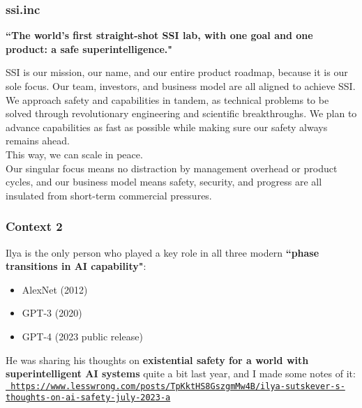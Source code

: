 \documentclass{beamer}
\newenvironment{customquote}
  {\begin{adjustwidth}{2em}{2em}\noindent\textnormal}
  {\end{adjustwidth}}
\newcommand{\msblue}[1]{{\color{myblue} #1}}
\begin{document}
\begin{frame}

  \frametitle{ssi.inc}

{\bf ``The world's first straight-shot SSI lab, with one goal and one product: a safe superintelligence."}\\[2ex]

\begin{customquote}
{\small SSI is our mission, our name, and our entire product roadmap, because it is our sole focus. Our team, investors, and business model are all aligned to achieve SSI.}\\[1ex]

{\small We approach safety and capabilities in tandem, as technical problems to be solved through revolutionary engineering and scientific breakthroughs. We plan to advance capabilities as fast as possible while making sure our safety always remains ahead.}\\[1ex]

{\small This way, we can scale in peace.}\\[1ex]

{\small Our singular focus means no distraction by management overhead or product cycles, and our business model means safety, security, and progress are all insulated from short-term commercial pressures.} 
\end{customquote}

\end{frame}


\begin{frame}

  \frametitle{Context 2}

Ilya is the only person who played a key role in all three modern {\bf ``phase transitions in AI capability"}:\\[2ex]

\begin{itemize}
  \item AlexNet (2012)
  \item GPT-3 (2020)
  \item GPT-4 (2023 public release)\\[2ex]
\end{itemize}

He was sharing his thoughts on {\bf existential safety for a world with superintelligent AI systems} quite a bit last year,
and I made some notes of it:\\[2ex]

\href{https://www.lesswrong.com/posts/TpKktHS8GszgmMw4B/ilya-sutskever-s-thoughts-on-ai-safety-july-2023-a}{\tt\tiny \msblue{https://www.lesswrong.com/posts/TpKktHS8GszgmMw4B/ilya-sutskever-s-thoughts-on-ai-safety-july-2023-a}}

\end{frame}
\end{document}
